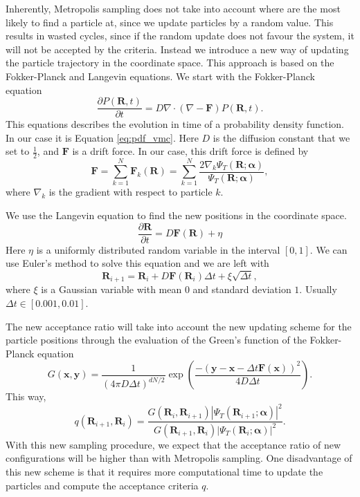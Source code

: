 \documentclass[aps,reprint,superscriptaddress,nofootinbib]{revtex4-2}
\begin{document}
    Inherently, Metropolis sampling does not take into account where are the most likely to find a particle at, since we update particles by a random value. This results in wasted cycles, since if the random update does not favour the system, it will not be accepted by the criteria. Instead we introduce a new way of updating the particle trajectory in the coordinate space. This approach is based on the Fokker-Planck and Langevin equations. We start with the Fokker-Planck equation
    \begin{equation*}
        \frac{\partial P(\bm R, t)}{\partial t} = D \nabla \cdot \left(\nabla - \bm F \right)P(\bm R, t).
    \end{equation*}
    This equations describes the evolution in time of a probability density function. In our case it is Equation \eqref{eq:pdf_vmc}. Here \(D\) is the diffusion constant that we set to \(\frac{1}{2}\), and \(\bm F\) is a drift force. In our case, this drift force is defined by
    \begin{equation*}
        \bm F = \sum_{k=1}^N \bm F_k (\bm R) = \sum_{k=1}^N \frac{2 \nabla_k \Psi_T(\bm R; \bm \alpha)}{\Psi_T(\bm R; \bm \alpha)},
    \end{equation*}
    where \(\nabla_k\) is the gradient with respect to particle \(k\).
    
    We use the Langevin equation to find the new positions in the coordinate space.
    \begin{equation*}
        \frac{\partial \bm R}{\partial t} = D \bm F(\bm R) + \eta
    \end{equation*}
    Here \(\eta\) is a uniformly distributed random variable in the interval \([0, 1]\). We can use Euler's method to solve this equation and we are left with 
    \begin{equation} \label{eq:langevin}
        \bm R_{i+1} = \bm R_i + D \bm F(\bm R_i) \Delta t + \xi \sqrt{\Delta t},
    \end{equation}
    where \(\xi\) is a Gaussian variable with mean \(0\) and standard deviation \(1\). Usually \(\Delta t \in [0.001, 0.01]\).
    
    The new acceptance ratio will take into account the new updating scheme for the particle positions through the evaluation of the Green's function of the Fokker-Planck equation
    \begin{equation} \label{eq:gfs}
        G(\bm x, \bm y) = \frac{1}{(4 \pi D \Delta t)^{dN/2}} \exp \left( \frac{-(\bm y - \bm x - \Delta t \bm F(\bm x))^2}{4 D \Delta t} \right).
    \end{equation}
    This way,
    \begin{equation*}
        q(\bm R_{i+1}, \bm R_i) = \frac{G(\bm R_i, \bm R_{i + 1}) \left| \Psi_T(\bm R_{i+1}; \bm \alpha) \right|^2}{G(\bm R_{i+1}, \bm R_i) \left| \Psi_T(\bm R_{i}; \bm \alpha) \right|^2}.
    \end{equation*}
    With this new sampling procedure, we expect that the acceptance ratio of new configurations will be higher than with Metropolis sampling. One disadvantage of this new scheme is that it requires more computational time to update the particles and compute the acceptance criteria \(q\). 
\end{document}
